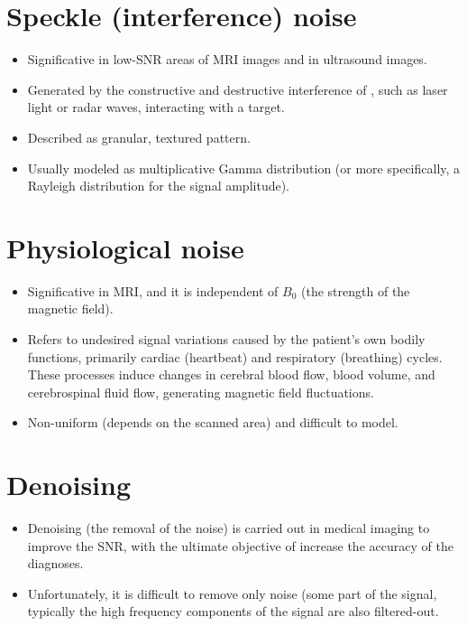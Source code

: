 \section{Speckle (interference) noise}
\begin{itemize}
\item Significative in low-SNR areas of \gls{MRI} images and in ultrasound images.
\item Generated by the constructive and destructive interference of
  , such as laser light or
  radar waves, interacting with a target.
\item Described as granular, textured pattern.
\item Usually modeled as multiplicative Gamma distribution (or more
  specifically, a Rayleigh distribution
  \cite{wikipedia_Rayleigh_distribution} for the signal amplitude).
\end{itemize}

\section{Physiological noise \texorpdfstring{\cite{scarciglia2023physiological}}{}}
\begin{itemize}
\item Significative in \gls{MRI}, and it is independent of $B_0$ (the
  strength of the magnetic field).
\item Refers to undesired signal variations caused by the patient's
  own bodily functions, primarily cardiac (heartbeat) and respiratory
  (breathing) cycles. These processes induce changes in cerebral blood
  flow, blood volume, and cerebrospinal fluid flow, generating
  magnetic field fluctuations.
\item Non-uniform (depends on the scanned area) and difficult to model.
\end{itemize}

\section{Denoising \texorpdfstring{\cite{buades2005review}}{}}
\begin{itemize}
\item Denoising (the removal of the noise) is carried out in
  medical imaging to improve the \gls{SNR}, with the ultimate
  objective of increase the accuracy of the diagnoses.
\item Unfortunately, it is difficult to remove only noise (some part
  of the signal, typically the high frequency components of the signal
  are also filtered-out.
\end{itemize}

